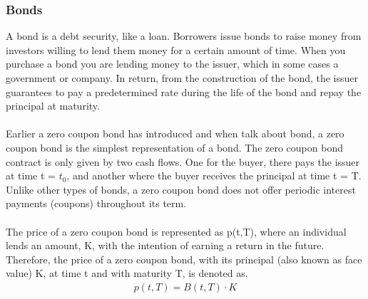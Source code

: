 \subsubsection{Bonds}
A bond is a debt security, like a loan. Borrowers issue bonds to raise money 
from investors willing to lend them money for a certain amount of time.
When you purchase a bond you are lending money to the issuer, which in 
some cases a government or company. In return, from the construction of the 
bond, the issuer guarantees to pay a predetermined rate during the life of the bond
and repay the principal at maturity. 
\\\\
Earlier a zero coupon bond has introduced and when talk about bond, a zero coupon 
bond is the simplest representation of a bond. The zero coupon bond contract is 
only given by two cash flows. One for the buyer, there pays the issuer at time 
t = $t_0$, and another where the buyer receives the principal at time t = T.
Unlike other types of bonds, a zero coupon bond does not offer periodic 
interest payments (coupons) throughout its term. \cite{Bjork} 
\\\\
The price of a zero coupon bond is represented as 
p(t,T), where an individual lends an amount, K, with the intention of earning a
return in the future. Therefore, the price of a zero coupon bond, with 
its principal (also known as face value) K, at time t and with maturity 
T, is denoted as.
\begin{align*}
    p(t,T)= B(t,T)\cdot K
\end{align*}
